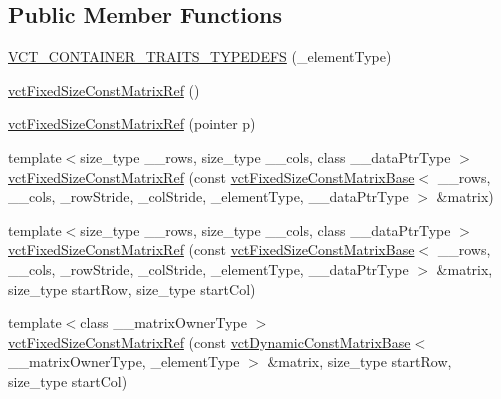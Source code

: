 \subsection*{Public Member Functions}
\begin{DoxyCompactItemize}
\item 
\hyperlink{classvct_fixed_size_const_matrix_ref_adaec9dc80ea835e3e382a4f9f73b6777}{V\+C\+T\+\_\+\+C\+O\+N\+T\+A\+I\+N\+E\+R\+\_\+\+T\+R\+A\+I\+T\+S\+\_\+\+T\+Y\+P\+E\+D\+E\+F\+S} (\+\_\+element\+Type)
\item 
\hyperlink{classvct_fixed_size_const_matrix_ref_a9b153cd096b48fbc69f2637a417bb382}{vct\+Fixed\+Size\+Const\+Matrix\+Ref} ()
\item 
\hyperlink{classvct_fixed_size_const_matrix_ref_af5338576a3658d1f256ed94bd7911a40}{vct\+Fixed\+Size\+Const\+Matrix\+Ref} (pointer p)
\item 
{\footnotesize template$<$size\+\_\+type \+\_\+\+\_\+rows, size\+\_\+type \+\_\+\+\_\+cols, class \+\_\+\+\_\+data\+Ptr\+Type $>$ }\\\hyperlink{classvct_fixed_size_const_matrix_ref_a3f3349e007ef22fb9efb62a6e2d227a6}{vct\+Fixed\+Size\+Const\+Matrix\+Ref} (const \hyperlink{classvct_fixed_size_const_matrix_base}{vct\+Fixed\+Size\+Const\+Matrix\+Base}$<$ \+\_\+\+\_\+rows, \+\_\+\+\_\+cols, \+\_\+row\+Stride, \+\_\+col\+Stride, \+\_\+element\+Type, \+\_\+\+\_\+data\+Ptr\+Type $>$ \&matrix)
\item 
{\footnotesize template$<$size\+\_\+type \+\_\+\+\_\+rows, size\+\_\+type \+\_\+\+\_\+cols, class \+\_\+\+\_\+data\+Ptr\+Type $>$ }\\\hyperlink{classvct_fixed_size_const_matrix_ref_aaf877bbc0f9ffda9ea5345ee97ff9dd9}{vct\+Fixed\+Size\+Const\+Matrix\+Ref} (const \hyperlink{classvct_fixed_size_const_matrix_base}{vct\+Fixed\+Size\+Const\+Matrix\+Base}$<$ \+\_\+\+\_\+rows, \+\_\+\+\_\+cols, \+\_\+row\+Stride, \+\_\+col\+Stride, \+\_\+element\+Type, \+\_\+\+\_\+data\+Ptr\+Type $>$ \&matrix, size\+\_\+type start\+Row, size\+\_\+type start\+Col)
\item 
{\footnotesize template$<$class \+\_\+\+\_\+matrix\+Owner\+Type $>$ }\\\hyperlink{classvct_fixed_size_const_matrix_ref_aada94bfe3741046a6e937e2635bda0b7}{vct\+Fixed\+Size\+Const\+Matrix\+Ref} (const \hyperlink{classvct_dynamic_const_matrix_base}{vct\+Dynamic\+Const\+Matrix\+Base}$<$ \+\_\+\+\_\+matrix\+Owner\+Type, \+\_\+element\+Type $>$ \&matrix, size\+\_\+type start\+Row, size\+\_\+type start\+Col)
\item 

\end{DoxyCompactItemize}
